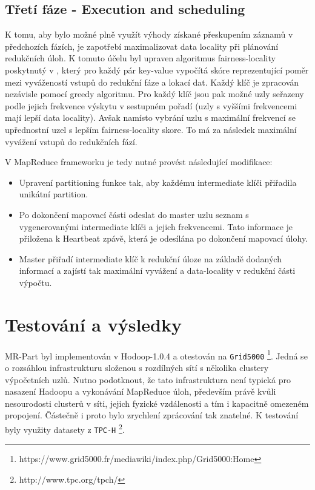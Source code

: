 \documentclass[thesis=M,czech]{FITthesis}[2012/06/26]
\begin{document}
\subsection{Třetí fáze - Execution and scheduling}
K tomu, aby bylo možné plně využít výhody získané přeskupením záznamů v předchozích fázích, je zapotřebí maximalizovat data locality při plánování redukčních úloh. K tomuto účelu byl upraven algoritmus fairness-locality poskytnutý v \cite{cloudcom}, který pro každý pár key-value vypočítá skóre reprezentující poměr mezi vyvážeností vstupů do redukční fáze a lokací dat. Každý klíč je zpracován nezávisle pomocí greedy algoritmu. Pro každý klíč jsou pak možné uzly seřazeny podle jejich frekvence výskytu v sestupném pořadí (uzly s vyššími frekvencemi mají lepší data locality). Avšak namísto vybrání uzlu s maximální frekvencí se upřednostní uzel s lepším fairness-locality skore. To má za následek maximální vyvážení vstupů do redukčních fází.

V MapReduce frameworku je tedy nutné provést následující modifikace:

\begin{itemize}
  \item Upravení partitioning funkce tak, aby každému intermediate klíči přiřadila unikátní partition.
  \item Po dokončení mapovací části odeslat do master uzlu seznam s vygenerovanými intermediate klíči a jejich frekvencemi. Tato informace je přiložena k Heartbeat zpávě, která je odesílána po dokončení mapovací úlohy.
  \item Master přiřadí  intermediate klíč k redukční úloze na základě dodaných informací a zajístí tak maximální vyvážení a data-locality v redukční části výpočtu.
\end{itemize} 

\section{Testování a výsledky}
MR-Part byl implementován v Hodoop-1.0.4 a otestován na \texttt{Grid5000} \footnote{https://www.grid5000.fr/mediawiki/index.php/Grid5000:Home}. Jedná se o  rozsáhlou infrastrukturu složenou s rozdílných sítí s několika clustery výpočetních uzlů. Nutno podotknout, že tato infrastruktura není typická pro nasazení Hadoopu a vykonávání MapReduce úloh, především právě  kvůli nesourodosti clusterů v síti, jejich fyzické vzdálenosti a tím i kapacitně omezeném propojení. Částečně i proto bylo zrychlení zprácování tak znatelné. K testování byly využity datasety z \texttt{TPC-H} \footnote{http://www.tpc.org/tpch/}. 
\end{document}
